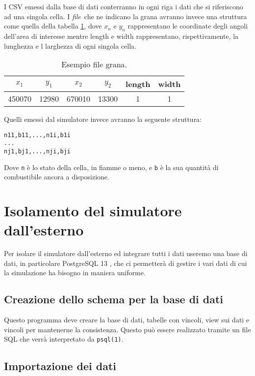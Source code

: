 \documentclass[draft]{article}
\newcommand{\eng}[1]{\foreignlanguage{english}{#1}} %
\newcommand{\psql}{\texttt{psql(1)}}
\newcommand{\file}{\textit{file}}
\begin{document}
I CSV emessi dalla base di dati conterranno in ogni riga i dati che si
riferiscono ad una singola cella. I \file\ che ne indicano la grana avranno
invece una struttura come quella della tabella \ref{tab:grain}, dove $x_n$ e
$y_n$ rappresentano le coordinate degli angoli dell'area di interesse mentre
\eng{length} e \eng{width} rappresentano, rispettivamente, la lunghezza e l
larghezza di ogni singola cella.

\begin{table}
\centering
\begin{tabular}{|c|c|c|c|c|c|}
	\hline
	$x_1$ & $y_1$ & $x_2$ & $y_2$ & \textbf{\eng{length}} & \textbf{\eng{width}}\\
	\hline
	450070 & 12980 & 670010 & 13300 & 1 & 1\\
	\hline
\end{tabular}
\caption{Esempio \eng{file} grana.}
\label{tab:grain}
\end{table}

Quelli emessi dal simulatore invece avranno la seguente struttura:

\begin{verbatim}
n11,b11,...,n1i,b1i
...
nj1,bj1,...,nji,bji
\end{verbatim}

Dove \texttt{n} è lo stato della cella, in fiamme o meno, e \texttt{b} è la sua
quantità di combustibile ancora a disposizione.

\section{Isolamento del simulatore dall'esterno}

Per isolare il simulatore dall'esterno ed integrare tutti i dati useremo una
base di dati, in particolare PostgreSQL 13 \cite{psql}, che ci permetterà di
gestire i vari dati di cui la simulazione ha bisogno in maniera uniforme.

\subsection{Creazione dello schema per la base di dati}

Questo programma deve creare la base di dati, tabelle con vincoli, \eng{view}
sui dati e vincoli per mantenerne la consistenza. Questo può essere realizzato
tramite un file SQL che verrà interpretato da \psql.

\subsection{Importazione dei dati}
\label{sec:import}
\end{document}
